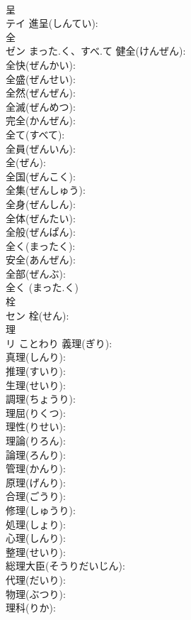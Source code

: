 \documentclass[8pt]{extreport}
\begin{document}
\begin{CJK}{UTF8}{min}
\\	呈			
\\	テイ		進呈(しんてい): 
\\	全			
\\	ゼン	まった.く、すべ.て	健全(けんぜん): 
\\	全快(ぜんかい): 
\\	全盛(ぜんせい): 
\\	全然(ぜんぜん): 
\\	全滅(ぜんめつ): 
\\	完全(かんぜん): 
\\	全て(すべて): 
\\	全員(ぜんいん): 
\\	全(ぜん): 
\\	全国(ぜんこく): 
\\	全集(ぜんしゅう): 
\\	全身(ぜんしん): 
\\	全体(ぜんたい): 
\\	全般(ぜんぱん): 
\\	全く(まったく): 
\\	安全(あんぜん): 
\\	全部(ぜんぶ): 
\\	全く (まった.く)
\\	栓			
\\	セン		栓(せん): 
\\	理			
\\	リ	ことわり	義理(ぎり): 
\\	真理(しんり): 
\\	推理(すいり): 
\\	生理(せいり): 
\\	調理(ちょうり): 
\\	理屈(りくつ): 
\\	理性(りせい): 
\\	理論(りろん): 
\\	論理(ろんり): 
\\	管理(かんり): 
\\	原理(げんり): 
\\	合理(ごうり): 
\\	修理(しゅうり): 
\\	処理(しょり): 
\\	心理(しんり): 
\\	整理(せいり): 
\\	総理大臣(そうりだいじん): 
\\	代理(だいり): 
\\	物理(ぶつり): 
\\	理科(りか): 

\end{CJK}
\end{document}
